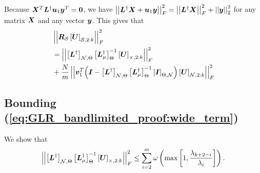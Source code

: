 Because $\bm{X}^{T}\bm{L}^{\dagger}\bm{u}_{1}\bm{y}^{T} = \bm{0}$, we have $\left\lvert\left\lvert\bm{L}^{\dagger}\bm{X} + \bm{u}_{1}\bm{y}\right\rvert\right\rvert^{2}_{F} = \left\lvert\left\lvert\bm{L}^{\dagger}\bm{X}\right\rvert\right\rvert^{2}_{F} + \left\lvert\left\lvert\bm{y}\right\rvert\right\rvert^{2}_{2}$ for any matrix $\bm{X}$ and any vector $\bm{y}$.
This gives that
\begin{align} 
    &\sqfrob{\matr{R}_{\set{S}}\msubgen[\set{S},2:k]{\matr{U}}} \\ 
    &=  \sqfrob{\msubgen[\set{N},\Theta]{\matr{L}^{\dagger}} \msubgen[\Theta]{\matr{L}^{\dagger}_{\mu}}^{-1}\msubgen[\set{\Theta},2:k]{\matr{U}}} \label{eq:GLR_bandlimited_proof:wide_term} \\
    &+ {\frac{N}{m}}\sqfrob{\vect{v}_{1}^{T}{\left( \matr{I} - \msubgen[\set{N},\Theta]{\matr{L}^{\dagger}} \msubgen[\Theta]{ \matr{L}_{\mu}^{\dagger}}^{-1}\msubgen[\Theta,\set{N}]{\matr{I}}\right)\msubgen[\set{N},2:k]{\matr{U}}}} \label{eq:GLR_bandlimited_proof:v1_term}
\end{align}

\subsection{Bounding (\ref{eq:GLR_bandlimited_proof:wide_term})}
We show that
\begin{align}
    \sqfrob{\msubgen[\set{N},\Theta]{\matr{L}^{\dagger}} \msubgen[\Theta]{\matr{L}^{\dagger}_{\mu}}^{-1}\msubgen[\set{\Theta},2:k]{\matr{U}}} \leq 
\sum^{m}_{i=2}\omega\left(\max\left[1,\frac{\lambda_{k+2-i}}{\lambda_{i}}\right]\right).
\end{align}


